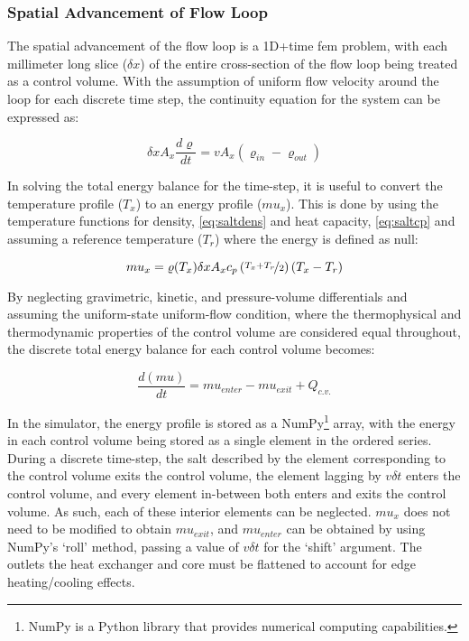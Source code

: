 \subsubsection{Spatial Advancement of Flow Loop}
The spatial advancement of the flow loop is a 1D+time \acs{fem} problem, with each millimeter long slice ($\delta x$) of the entire cross-section of the flow loop being treated as a control volume. With the assumption of uniform flow velocity around the loop for each discrete time step, the continuity equation for the system can be expressed as:

\begin{equation}
    \delta x A_x \frac{d\varrho}{dt} = v A_x(\varrho_{in}-\varrho_{out})
\end{equation}

In solving the total energy balance for the time-step, it is useful to convert the temperature profile ($T_x$) to an energy profile ($mu_x$). This is done by using the temperature functions for density, \ref{eq:saltdens}  and heat capacity, \ref{eq:saltcp} and assuming a reference temperature ($T_r$) where the energy is defined as null:

\begin{equation}\label{eq:T2mu}
    mu_x = \varrho(T_x)\delta x A_x c_p\left(\nicefrac{T_x+T_r}{2}\right)(T_x-T_r) 
\end{equation}

By neglecting gravimetric, kinetic, and pressure-volume differentials and assuming the uniform-state uniform-flow condition, where the thermophysical and thermodynamic properties of the control volume are considered equal throughout, the discrete total energy balance for each control volume becomes:

\begin{equation}
    \frac{d(mu)}{dt} = mu_{enter} - mu_{exit} + Q_{c.v.}
\end{equation}

In the simulator, the energy profile is stored as a NumPy\footnote{NumPy is a Python library that provides numerical computing capabilities.} array, with the energy in each control volume being stored as a single element in the ordered series. During a discrete time-step, the salt described by the element corresponding to the control volume exits the control volume, the element lagging by $v\delta t$ enters the control volume, and every element in-between both enters and exits the control volume. As such, each of these interior elements can be neglected. $mu_x$ does not need to be modified to obtain $mu_{exit}$, and $mu_{enter}$ can be obtained by using NumPy's `roll' method, passing a value of $v\delta t$ for the `shift' argument. The outlets the heat exchanger and core must be flattened to account for edge heating/cooling effects. 

